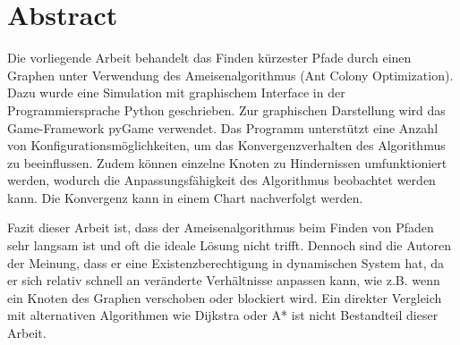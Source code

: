 

\chapter*{Abstract}

Die vorliegende Arbeit behandelt das Finden kürzester Pfade durch einen Graphen
unter Verwendung des Ameisenalgorithmus (Ant Colony Optimization). Dazu wurde
eine Simulation mit graphischem Interface in der Programmiersprache Python
geschrieben. Zur graphischen Darstellung wird das Game-Framework pyGame
verwendet. Das Programm unterstützt eine Anzahl von Konfigurationsmöglichkeiten,
um das Konvergenzverhalten des Algorithmus zu beeinflussen. Zudem können
einzelne Knoten zu Hindernissen umfunktioniert werden, wodurch die
Anpassungsfähigkeit des Algorithmus beobachtet werden kann. Die Konvergenz kann
in einem Chart nachverfolgt werden.

Fazit dieser Arbeit ist, dass der Ameisenalgorithmus beim Finden von Pfaden sehr
langsam ist und oft die ideale Lösung nicht trifft. Dennoch sind die Autoren der
Meinung, dass er eine Existenzberechtigung in dynamischen System hat, da er sich
relativ schnell an veränderte Verhältnisse anpassen kann, wie z.B. wenn ein
Knoten des Graphen verschoben oder blockiert wird. Ein direkter Vergleich mit
alternativen Algorithmen wie Dijkstra oder A* ist nicht Bestandteil dieser
Arbeit.